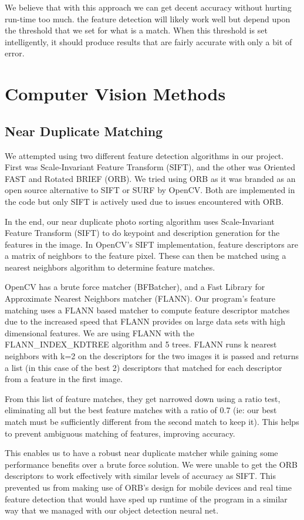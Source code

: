 \documentclass[12pt]{article}
\begin{document}
	We believe that with this approach we can get decent accuracy without hurting run-time too much. the feature detection will likely work well but depend upon the threshold that we set for what is a match. When this threshold is set intelligently, it should produce results that are fairly accurate with only a bit of error.

\section{Computer Vision Methods}
\subsection{Near Duplicate Matching}
	We attempted using two different feature detection algorithms in our project. First was Scale-Invariant Feature Transform (SIFT), and the other was Oriented FAST and Rotated BRIEF (ORB). We tried using ORB as it was branded as an open source alternative to SIFT or SURF by OpenCV. Both are implemented in the code but only SIFT is actively used due to issues encountered with ORB.
	
	In the end, our near duplicate photo sorting algorithm uses Scale-Invariant Feature Transform (SIFT) to do keypoint and description generation for the features in the image. In OpenCV's SIFT implementation, feature descriptors are a matrix of neighbors to the feature pixel. These can then be matched using a nearest neighbors algorithm to determine feature matches. 
	
	OpenCV has a brute force matcher (BFBatcher), and a Fast Library for Approximate Nearest Neighbors matcher (FLANN). Our program's feature matching uses a FLANN based matcher to compute feature descriptor matches due to the increased speed that FLANN provides on large data sets with high dimensional features. We are using FLANN with the FLANN\_INDEX\_KDTREE algorithm and 5 trees. FLANN runs k nearest neighbors with k=2 on the descriptors for the two images it is passed and returns a list (in this case of the best 2) descriptors that matched for each descriptor from a feature in the first image.
	
	From this list of feature matches, they get narrowed down using a ratio test, eliminating all but the best feature matches with a ratio of 0.7 (ie: our best match must be  sufficiently different from the second match to keep it). This helps to prevent ambiguous matching of features, improving accuracy.
	
	This enables us to have a robust near duplicate matcher while gaining some performance benefits over a brute force solution. We were unable to get the ORB descriptors to work effectively with similar levels of accuracy as SIFT. This prevented us from making use of ORB's design for mobile devices and real time feature detection that would have sped up runtime of the program in a similar way that we managed with our object detection neural net.
	
\end{document}
